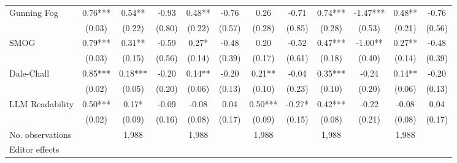 \begin{table}
\begin{threeparttable}
\begin{tabular}{p{3cm}S@{}S@{}S@{}S@{}S@{}S@{}S@{}S@{}S@{}S@{}S@{}}
            Gunning Fog                   &        0.76***&        0.54** &       -0.93   &        0.48** &       -0.76   &        0.26   &       -0.71   &        0.74***&       -1.47***&        0.48** &       -0.76   \\
                                          &      (0.03)   &      (0.22)   &      (0.80)   &      (0.22)   &      (0.57)   &      (0.28)   &      (0.85)   &      (0.28)   &      (0.53)   &      (0.21)   &      (0.56)   \\
            SMOG                          &        0.79***&        0.31** &       -0.59   &        0.27*  &       -0.48   &        0.20   &       -0.52   &        0.47***&       -1.00** &        0.27** &       -0.48   \\
                                          &      (0.03)   &      (0.15)   &      (0.56)   &      (0.14)   &      (0.39)   &      (0.17)   &      (0.61)   &      (0.18)   &      (0.40)   &      (0.14)   &      (0.39)   \\
            Dale-Chall                    &        0.85***&        0.18***&       -0.20   &        0.14** &       -0.20   &        0.21** &       -0.04   &        0.35***&       -0.24   &        0.14** &       -0.20   \\
                                          &      (0.02)   &      (0.05)   &      (0.20)   &      (0.06)   &      (0.13)   &      (0.10)   &      (0.23)   &      (0.10)   &      (0.20)   &      (0.06)   &      (0.13)   \\
            LLM Readability               &        0.50***&        0.17*  &       -0.09   &       -0.08   &        0.04   &        0.50***&       -0.27*  &        0.42***&       -0.22   &       -0.08   &        0.04   \\
                                          &      (0.02)   &      (0.09)   &      (0.16)   &      (0.08)   &      (0.17)   &      (0.09)   &      (0.15)   &      (0.08)   &      (0.21)   &      (0.08)   &      (0.17)   \\
            \midrule
            No. observations              &               &       1,988   &               &       1,988   &               &       1,988   &               &       1,988   &               &       1,988   &               \\
            \midrule
            Editor effects       &               &           {}   &               &           {}   &               &           {}   &               &           {}   &               &               &               \\

\end{tabular}
\end{threeparttable}
\end{table}
